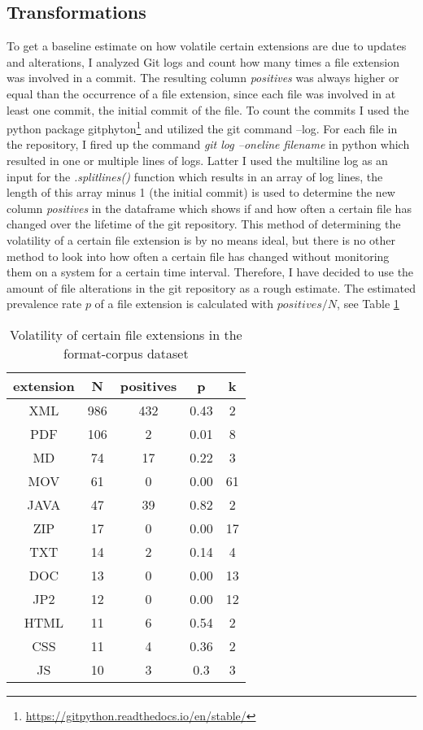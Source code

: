 \subsection{Transformations}
To get a baseline estimate on how volatile certain extensions are due to updates and alterations, I analyzed Git logs and count how many times a file extension was involved in a commit. The resulting column \textit{positives} was always higher or equal than the occurrence of a file extension, since each file was involved in at least one commit, the initial commit of the file. To count the commits I used the python package gitphyton\footnote{\url{https://gitpython.readthedocs.io/en/stable/}} and utilized the git command --log. For each file in the repository, I fired up the command \textit{git log --oneline filename} in python which resulted in one or multiple lines of logs. Latter I used the multiline log as an input for the \textit{.splitlines()} function which results in an array of log lines, the length of this array minus 1 (the initial commit) is used to determine the new column \textit{positives} in the dataframe which shows if and how often a certain file has changed over the lifetime of the git repository. 
This method of determining the volatility of a certain file extension is by no means ideal, but there is no other method to look into how often a certain file has changed without monitoring them on a system for a certain time interval. Therefore, I have decided to use the amount of file alterations in the git repository as a rough estimate.
The estimated prevalence rate $p$ of a file extension is calculated with $positives/N$, see Table \ref{tb:git-alterations}
\begin{table}[ht]
    \caption{Volatility of certain file extensions in the format-corpus dataset}
    \centering
    \begin{tabular}{ c c c c c}
    \label{tb:git-alterations}
     extension & N & positives & p & k\\ 
     \hline
     XML & 986 & 432 & 0.43  & 2\\  
     \hline
     PDF &106 &2 &0.01  & 8\\
     \hline
     MD & 74 & 17 & 0.22  & 3\\    
     \hline
     MOV&61 & 0 & 0.00 &  61\\  
     \hline
     JAVA &47 &39&0.82 & 2 \\  
     \hline
     ZIP & 17 &0 &0.00 &  17\\
     \hline
     TXT & 14 & 2 & 0.14 &  4\\ 
     \hline
     DOC & 13 & 0 & 0.00 &  13\\   
     \hline
     JP2 & 12 & 0 & 0.00 &  12\\    
     \hline
     HTML & 11 & 6 & 0.54 &  2\\   
     \hline
     CSS & 11 & 4 & 0.36 & 2 \\ 
     \hline
     JS & 10 & 3 & 0.3 & 3
    \end{tabular}
\end{table}
